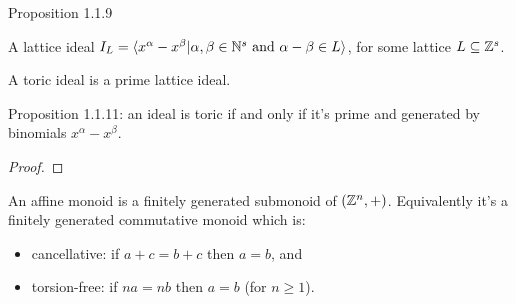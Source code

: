 \begin{proposition}
  \label{prop:1.1.9}
  Proposition 1.1.9
\end{proposition}

\begin{definition}
  \label{AddMonoidAlgebra.IsToricIdeal}
  \leanok
  A lattice ideal $I_L = \langle x^\alpha - x^\beta |  \alpha, \beta \in {\mathbb N}^s \text{ and } \alpha - \beta \in L\rangle$, for some lattice $L \subseteq {\mathbb Z}^s$.

  A toric ideal is a prime lattice ideal.
\end{definition}

\begin{proposition}
  \label{AddMonoidAlgebra.isToricIdeal_iff_exists_span_single_sub_single}
  Proposition 1.1.11: an ideal is toric if and only if it's prime and generated by binomials $x^\alpha - x^\beta$.
\end{proposition}
\begin{proof}
\end{proof}

\begin{definition}
  \label{affSemi}
  An affine monoid is a finitely generated submonoid of $({\mathbb Z}^n, +)$. Equivalently it's a finitely generated commutative monoid which is:
  \begin{itemize}
    \item cancellative: if $a + c = b + c$ then $a = b$, and
    \item torsion-free: if $n a = n b$ then $a = b$ (for $n \geq 1$).
  \end{itemize}
\end{definition}


